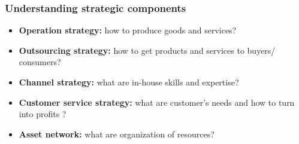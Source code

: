 \documentclass[10pt,handout,notes=show]{beamer}
\begin{document}
\begin{frame}[label=stra]
  \frametitle{Understanding strategic components }

   \begin{itemize}
    \item \textbf{Operation strategy:} how to produce goods and services?
    \item \textbf{Outsourcing strategy:} how to get products and services to buyers/ consumers?  \hfill \hyperlink{outs}{}
    \item \textbf{Channel strategy:} what are in-house skills and expertise? \hfill \hyperlink{chan}{}
    \item \textbf{Customer service strategy:} what are customer's needs and how to turn into profits ? \hfill \hyperlink{chan}{}
    \item \textbf{Asset network:} what are organization of resources? \hfill \hyperlink{asset}{}
   \end{itemize}

\end{frame}
\end{document}
